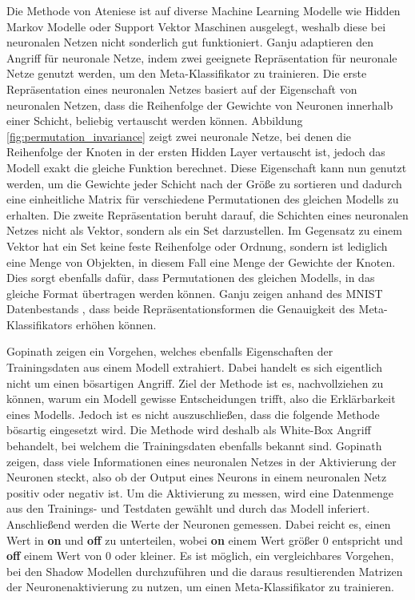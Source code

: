 Die Methode von Ateniese \etal \cite{P-80} ist auf diverse Machine Learning Modelle wie Hidden Markov Modelle oder Support Vektor Maschinen ausgelegt, weshalb diese bei neuronalen Netzen nicht sonderlich gut funktioniert. 
Ganju \etal \cite{P-11} adaptieren den Angriff für neuronale Netze, indem zwei geeignete Repräsentation für neuronale Netze genutzt werden, um den Meta-Klassifikator zu trainieren.
Die erste Repräsentation eines neuronalen Netzes basiert auf der Eigenschaft von neuronalen Netzen, dass die Reihenfolge der Gewichte von Neuronen innerhalb einer Schicht, beliebig vertauscht werden können. 
Abbildung \ref{fig:permutation_invariance} zeigt zwei neuronale Netze, bei denen die Reihenfolge der Knoten in der ersten Hidden Layer vertauscht ist, jedoch das Modell exakt die gleiche Funktion berechnet.
Diese Eigenschaft kann nun genutzt werden, um die Gewichte jeder Schicht nach der Größe zu sortieren und dadurch eine einheitliche Matrix für verschiedene Permutationen des gleichen Modells zu erhalten.
Die zweite Repräsentation beruht darauf, die Schichten eines neuronalen Netzes nicht als Vektor, sondern als ein Set darzustellen.
Im Gegensatz zu einem Vektor hat ein Set keine feste Reihenfolge oder Ordnung, sondern ist lediglich eine Menge von Objekten, in diesem Fall eine Menge der Gewichte der Knoten.
Dies sorgt ebenfalls dafür, dass Permutationen des gleichen Modells, in das gleiche Format übertragen werden können.
Ganju \etal \cite{P-11} zeigen anhand des MNIST Datenbestands \cite{D-MNIST}, dass beide Repräsentationsformen die Genauigkeit des Meta-Klassifikators erhöhen können.


Gopinath \etal \cite{P-12} zeigen ein Vorgehen, welches ebenfalls Eigenschaften der Trainingsdaten aus einem Modell extrahiert. 
Dabei handelt es sich eigentlich nicht um einen bösartigen Angriff.
Ziel der Methode ist es, nachvollziehen zu können, warum ein Modell gewisse Entscheidungen trifft, also die Erklärbarkeit eines Modells.
Jedoch ist es nicht auszuschließen, dass die folgende Methode bösartig eingesetzt wird.
Die Methode wird deshalb als White-Box Angriff behandelt, bei welchem die Trainingsdaten ebenfalls bekannt sind.
Gopinath \etal \cite{P-12} zeigen, dass viele Informationen eines neuronalen Netzes in der Aktivierung der Neuronen steckt, also ob der Output eines Neurons in einem neuronalen Netz positiv oder negativ ist.
Um die Aktivierung zu messen, wird eine Datenmenge aus den Trainings- und Testdaten gewählt und durch das Modell inferiert.
Anschließend werden die Werte der Neuronen gemessen.
Dabei reicht es, einen Wert in \textbf{on} und \textbf{off} zu unterteilen, wobei \textbf{on} einem Wert größer 0 entspricht und \textbf{off} einem Wert von 0 oder kleiner.
Es ist möglich, ein vergleichbares Vorgehen, bei den Shadow Modellen durchzuführen und die daraus resultierenden Matrizen der Neuronenaktivierung zu nutzen, um einen Meta-Klassifikator zu trainieren.
